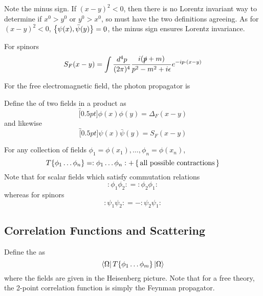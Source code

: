 \documentclass{article}
\begin{document}
\begin{idea}
Note the minus sign. If $(x-y)^2 < 0$, then there is no Lorentz invariant way to determine if $x^0 > y^0$ or $y^0 > x^0$, so must have the two definitions agreeing. As for $(x-y)^2 < 0$, $\acomm[\psi(x)]{\bar{\psi}(y)}=0$, the minus sign ensures Lorentz invariance. 
\end{idea}

\begin{theorem}
For spinors 
\[
S_F(x-y) = \int \fmeas \frac{i(\slashed{p}+m)}{p^2-m^2+i\eps} e^{-ip\cdot (x-y)}
\]
\end{theorem}

\begin{theorem}
For the free electromagnetic field, the photon propagator is 
\end{theorem}

\begin{definition}[Contraction]
Define the  of two fields in a product as 
\[
\overbracket[0.5pt]{\phi(x)\phi(y)} = \Delta_F(x-y)
\]
and likewise 
\[
\overbracket[0.5pt]{\psi(x)\bar{\psi}(y)} = S_F(x-y)
\]
\end{definition}

\begin{theorem}
For any collection of fields $\phi_1 = \phi(x_1), \dots, \phi_n = \phi(x_n)$, 
\[
T \{ \phi_1 \dots \phi_n \} = :\phi_1 \dots \phi_n: + \set{\text{all possible contractions}}
\]
Note that for scalar fields which satisfy commutation relations 
\[
:\phi_1 \phi_2: = :\phi_2 \phi_1 : 
\]
whereas for spinors 
\[
:\psi_1 \psi_2: = -:\psi_2 \psi_1 : 
\]
\end{theorem}
\subsection{Correlation Functions and Scattering}

\begin{definition}
Define the  as 
\[
\bra{\Omega} T\{ \phi_1 \dots \phi_m \} \ket{\Omega}
\]
where the fields are given in the Heisenberg picture. Note that for a free theory, the 2-point correlation function is simply the Feynman propagator. 
\end{definition}
\end{document}
